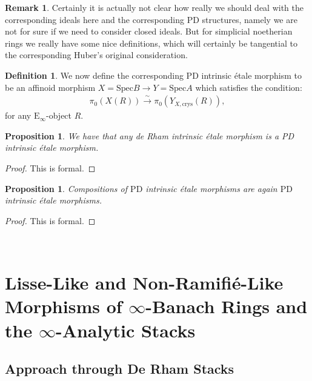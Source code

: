 \documentclass[12pt]{amsart}
\newtheorem{proposition}[theorem]{Proposition}
\theoremstyle{definition}
\newtheorem{definition}[theorem]{Definition}
\newtheorem{remark}[theorem]{Remark}
\numberwithin{equation}{section}
\begin{document}
\begin{remark}
Certainly it is actually not clear how really we should deal with the corresponding ideals here and the corresponding PD structures, namely we are not for sure if we need to consider closed ideals. But for simplicial noetherian rings we really have some nice definitions, which will certainly be tangential to the corresponding Huber's original consideration.
\end{remark}


\begin{definition}
We now define the corresponding PD intrinsic \'etale morphism to be an affinoid morphism $X=\mathrm{Spec}B\rightarrow Y=\mathrm{Spec}A$ which satisfies the condition:
\begin{align}
\pi_0(X(R))\overset{\sim}{\rightarrow}	\pi_0(Y_{X,\mathrm{crys}}(R)),
\end{align}
for any $\mathrm{E}_\infty$-object $R$.		
\end{definition}


\begin{proposition}
We have that any de Rham intrinsic \'etale morphism is a PD intrinsic \'etale morphism.	
\end{proposition}

\begin{proof}
This is formal.	
\end{proof}








\begin{proposition}
Compositions of $\mathrm{PD}$ intrinsic \'etale morphisms are again $\mathrm{PD}$ intrinsic \'etale morphisms.
\end{proposition}

\begin{proof}
This is formal.	
\end{proof}









\

\section{Lisse-Like and Non-Ramifi\'e-Like Morphisms of $\infty$-Banach Rings and the $\infty$-Analytic Stacks}


\subsection{Approach through De Rham Stacks}
\end{document}
